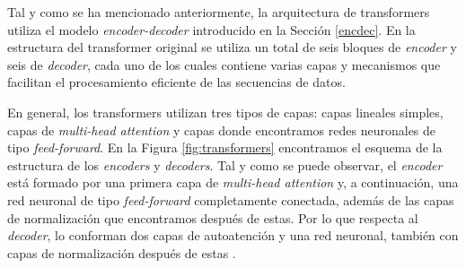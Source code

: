 \documentclass[11pt,spanish,listoffigures,listoftables]{tfgetsinf}
\begin{document}
Tal y como se ha mencionado anteriormente, la arquitectura de transformers utiliza el modelo \textit{encoder-decoder} introducido en la Sección \ref{encdec}. En la estructura del transformer original se utiliza un total de seis bloques de \textit{encoder} y seis de \textit{decoder}, cada uno de los cuales contiene varias capas y mecanismos que facilitan el procesamiento eficiente de las secuencias de datos.

En general, los transformers utilizan tres tipos de capas: capas lineales simples, capas de \textit{multi-head attention} y capas donde encontramos redes neuronales de tipo \textit{feed-forward}. En la Figura \ref{fig:transformers} encontramos el esquema de la estructura de los \textit{encoders} y  \textit{decoders}. Tal y como se puede observar, el \textit{encoder} está formado por una primera capa de \textit{multi-head attention} y, a continuación, una red neuronal de tipo \textit{feed-forward} completamente conectada, además de las capas de normalización que encontramos después de estas. Por lo que respecta al \textit{decoder}, lo conforman dos capas de autoatención y una red neuronal, también con capas de normalización después de estas \cite{jurafsky2023speech, multiheaddotproduct}.
\end{document}
